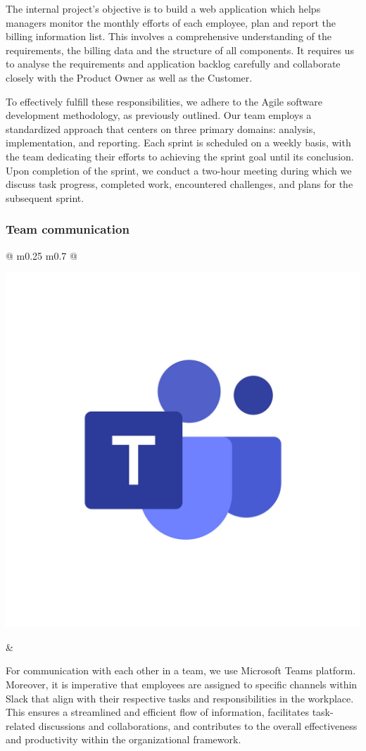     The internal project's objective is to build a web application which helps managers monitor the monthly efforts of each employee, plan and report the billing information list. This involves a comprehensive understanding of the requirements, the billing data and the structure of all components. It requires us to analyse the requirements and application backlog carefully and collaborate closely with the Product Owner as well as the Customer.

    To effectively fulfill these responsibilities, we adhere to the Agile software development methodology, as previously outlined. Our team employs a standardized approach that centers on three primary domains: analysis, implementation, and reporting. Each sprint is scheduled on a weekly basis, with the team dedicating their efforts to achieving the sprint goal until its conclusion. Upon completion of the sprint, we conduct a two-hour meeting during which we discuss task progress, completed work, encountered challenges, and plans for the subsequent sprint.
    
    \subsubsection{Team communication}

    \begin{tabular}{ @{} m{0.25\textwidth} m{0.7\textwidth} @{} }
      \begin{minipage}{\linewidth}
        \centering
        \includegraphics[width=0.7\linewidth]{graphics/ms-teams-logo.jpg}
        \label{fig:ms-teams-logo}
      \end{minipage}
      &
      \begin{minipage}{\linewidth}
            For communication with each other in a team, we use Microsoft Teams platform.  Moreover, it is imperative that employees are assigned to specific channels within Slack that align with their respective tasks and responsibilities in the workplace. This ensures a streamlined and efficient flow of information, facilitates task-related discussions and collaborations, and contributes to the overall effectiveness and productivity within the organizational framework.
      \end{minipage}
    \end{tabular}

